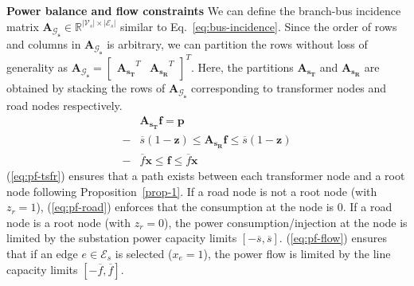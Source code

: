 \documentclass[sigconf]{acmart}
\begin{document}
\noindent\textbf{Power balance and flow constraints}
We can define the branch-bus incidence matrix $\mathbf{A_{\mathcal{G}_s}}\in\mathbb{R}^{|\mathcal{V}_s|\times|\mathcal{E}_s|}$ similar to Eq.~\ref{eq:bus-incidence}. Since the order of rows and columns in $\mathbf{A_{\mathcal{G}_s}}$ is arbitrary, we can partition the rows without loss of generality as $\mathbf{A_{\mathcal{G}_s}}=\begin{bmatrix}\mathbf{A_{s_T}}^T&\mathbf{A_{s_R}}^T\end{bmatrix}^T$. Here, the partitions $\mathbf{A_{s_T}}$ and $\mathbf{A_{s_R}}$ are obtained by stacking the rows of $\mathbf{A_{\mathcal{G}_s}}$ corresponding to transformer nodes and road nodes respectively.
\begin{subequations}
	\begin{align}
		&\mathbf{A_{s_T}}\mathbf{f}=\mathbf{p}\label{eq:pf-tsfr}\\
		-&\overline{s}(1-\mathbf{z})\leq\mathbf{A_{s_R}}\mathbf{f}\leq\overline{s}(1-\mathbf{z})\label{eq:pf-road}\\
		-&\overline{f}\mathbf{x}\leq \mathbf{f}\leq \overline{f}\mathbf{x}\label{eq:pf-flow}
	\end{align}
	\label{eq:prim-pf}
\end{subequations}
(\ref{eq:pf-tsfr}) ensures that a path exists between each transformer node and a root node following Proposition~\ref{prop-1}. If a road node is not a root node (with $z_r=1$), (\ref{eq:pf-road}) enforces that the consumption at the node is $0$. If a road node is a root node (with $z_r=0$), the power consumption/injection at the node is limited by the substation power capacity limits $[-\overline{s},\overline{s}]$. (\ref{eq:pf-flow}) ensures that if an edge $e\in\mathcal{E}_s$ is selected ($x_e=1$), the power flow is limited by the line capacity limits $[-\overline{f},\overline{f}]$.
\end{document}
